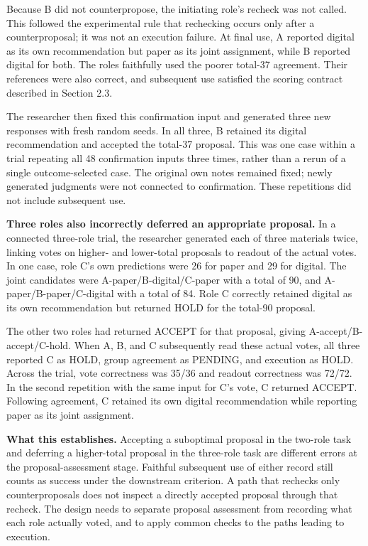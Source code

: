 \documentclass[10pt,a4paper]{article}
\begin{document}
Because B did not counterpropose, the initiating role's recheck was not called. This followed the experimental rule that rechecking occurs only after a counterproposal; it was not an execution failure. At final use, A reported digital as its own recommendation but paper as its joint assignment, while B reported digital for both. The roles faithfully used the poorer total-37 agreement. Their references were also correct, and subsequent use satisfied the scoring contract described in Section 2.3.

The researcher then fixed this confirmation input and generated three new responses with fresh random seeds. In all three, B retained its digital recommendation and accepted the total-37 proposal. This was one case within a trial repeating all 48 confirmation inputs three times, rather than a rerun of a single outcome-selected case. The original own notes remained fixed; newly generated judgments were not connected to confirmation. These repetitions did not include subsequent use.

\textbf{Three roles also incorrectly deferred an appropriate proposal.} In a connected three-role trial, the researcher generated each of three materials twice, linking votes on higher- and lower-total proposals to readout of the actual votes. In one case, role C's own predictions were 26 for paper and 29 for digital. The joint candidates were A-paper/B-digital/C-paper with a total of 90, and A-paper/B-paper/C-digital with a total of 84. Role C correctly retained digital as its own recommendation but returned HOLD for the total-90 proposal.

The other two roles had returned ACCEPT for that proposal, giving A-accept/B-accept/C-hold. When A, B, and C subsequently read these actual votes, all three reported C as HOLD, group agreement as PENDING, and execution as HOLD. Across the trial, vote correctness was 35/36 and readout correctness was 72/72. In the second repetition with the same input for C's vote, C returned ACCEPT. Following agreement, C retained its own digital recommendation while reporting paper as its joint assignment.

\textbf{What this establishes.} Accepting a suboptimal proposal in the two-role task and deferring a higher-total proposal in the three-role task are different errors at the proposal-assessment stage. Faithful subsequent use of either record still counts as success under the downstream criterion. A path that rechecks only counterproposals does not inspect a directly accepted proposal through that recheck. The design needs to separate proposal assessment from recording what each role actually voted, and to apply common checks to the paths leading to execution.
\end{document}
